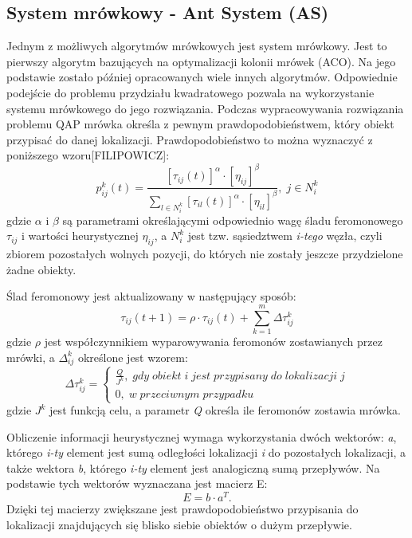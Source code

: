 \subsection{System mrówkowy - Ant System (AS)}
Jednym z możliwych algorytmów mrówkowych jest system mrówkowy. Jest to pierwszy algorytm bazujących na optymalizacji kolonii mrówek (ACO). Na jego podstawie zostało później opracowanych wiele innych algorytmów. Odpowiednie podejście do problemu przydziału kwadratowego pozwala na wykorzystanie systemu mrówkowego do jego rozwiązania. Podczas wypracowywania rozwiązania problemu QAP mrówka określa z pewnym prawdopodobieństwem, który obiekt przypisać do danej lokalizacji. Prawdopodobieństwo to można wyznaczyć z poniższego wzoru[FILIPOWICZ]:
\newline
\begin{equation}
p_{ij}^k(t)=\frac{[\tau_{ij}(t)]^\alpha\cdot[\eta_{ij}]^\beta}{\sum\limits_{l\in N_i^k} [\tau_{il}(t)]^\alpha\cdot[\eta_{il}]^\beta}, \; j \in N_i^k
\end{equation}
\newline
gdzie $\alpha$ i $\beta$ są parametrami  określającymi odpowiednio wagę śladu feromonowego $\tau_{ij}$ i wartości heurystycznej $\eta_{ij}$, a $N_i^k$ jest tzw. sąsiedztwem \textit{i-tego} węzła, czyli zbiorem pozostałych wolnych pozycji, do których nie zostały jeszcze przydzielone żadne obiekty.

Ślad feromonowy jest aktualizowany w następujący sposób:
\newline
\begin{equation}
\tau_{ij}(t+1)= \rho \cdot \tau_{ij}(t)+\sum\limits_{k=1}^m \Delta \tau_{ij}^k
\end{equation}
\newline
gdzie $\rho$ jest współczynnikiem wyparowywania feromonów zostawianych przez mrówki, a $\Delta_{ij}^k$ określone jest wzorem:
\newline
\begin{equation}
\Delta \tau_{ij}^k = \left\{ \begin{array}{ccc} \frac{Q}{J^k}, \; gdy \; obiekt \; i \; jest \; przypisany \; do \; lokalizacji \; j \\ 0, \; w \; przeciwnym \;  przypadku \end{array} \right.
\end{equation}
\newline
gdzie $J^k$ jest funkcją celu, a parametr \textit{Q} określa ile feromonów zostawia mrówka.

Obliczenie informacji heurystycznej wymaga wykorzystania dwóch wektorów: \textit{a}, którego \textit{i-ty} element jest sumą odległości lokalizacji \textit{i} do pozostałych lokalizacji, a także wektora \textit{b}, którego \textit{i-ty} element jest analogiczną sumą przepływów. Na podstawie tych wektorów wyznaczana jest macierz E:
\newline
\begin{equation}
E=b \cdot a^T.
\end{equation}
\newline
Dzięki tej macierzy zwiększane jest prawdopodobieństwo przypisania do lokalizacji znajdujących się blisko siebie obiektów o dużym przepływie.

